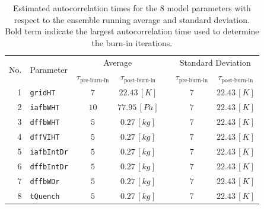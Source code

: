 \begin{table}[h]
	\myfloatalign
	\caption[Estimated autocorrelation times for the $8$ model parameters with respect to the ensemble running average and standard deviation.]{Estimated autocorrelation times for the $8$ model parameters with respect to the ensemble running average and standard deviation. Bold term indicate the largest autocorrelation time used to determine the burn-in iterations.}
	\label{tab:ch5_ens_stat_mcmc}
	\begin{tabularx}{1.05\textwidth}{rlccccc} \toprule
		\multirow{2}{*}{No.}			&\multirow{2}{*}{Parameter}		&\multicolumn{2}{c}{Average}	&\phantom{a}&\multicolumn{2}{c}{Standard Deviation}\\
																															\cmidrule{3-4}	\cmidrule{6-7}
															&															& $\tau_{\text{pre-burn-in}}$ 		& $\tau_{\text{post-burn-in}}$	&& $\tau_{\text{pre-burn-in}}$ & $\tau_{\text{post-burn-in}}$ \\ \midrule
		1	&	\texttt{gridHT}				& \footnotesize{$7$}  				& \footnotesize{$22.43 \, [K] $} 	&& \footnotesize{$7$}  					& \footnotesize{$22.43 \, [K] $}\\
		2	&	\texttt{iafbWHT} 			& \footnotesize{$10$} 				& \footnotesize{$77.95 \, [Pa]$} 	&& \footnotesize{$7$}  					& \footnotesize{$22.43 \, [K] $}\\
		3	&	\texttt{dffbWHT} 			& \footnotesize{$5$}  				& \footnotesize{$ 0.27 \, [kg]$} 	&& \footnotesize{$7$}  					& \footnotesize{$22.43 \, [K] $}\\
		4	&	\texttt{dffVIHT}			& \footnotesize{$5$}  				& \footnotesize{$ 0.27 \, [kg]$} 	&& \footnotesize{$7$}  					& \footnotesize{$22.43 \, [K] $}\\
		5	&	\texttt{iafbIntDr} 		& \footnotesize{$5$}  				& \footnotesize{$ 0.27 \, [kg]$} 	&& \footnotesize{$7$}  					& \footnotesize{$22.43 \, [K] $}\\
		6	&	\texttt{dffbIntDr} 		& \footnotesize{$5$}  				& \footnotesize{$ 0.27 \, [kg]$} 	&& \footnotesize{$7$}  					& \footnotesize{$22.43 \, [K] $}\\
		7	&	\texttt{dffbWDr}			& \footnotesize{$5$}  				& \footnotesize{$ 0.27 \, [kg]$} 	&& \footnotesize{$7$}  					& \footnotesize{$22.43 \, [K] $}\\
		8	&	\texttt{tQuench} 			& \footnotesize{$5$}  				& \footnotesize{$ 0.27 \, [kg]$} 	&& \footnotesize{$7$}  					& \footnotesize{$22.43 \, [K] $}\\
		\bottomrule
	\end{tabularx}
\end{table}
